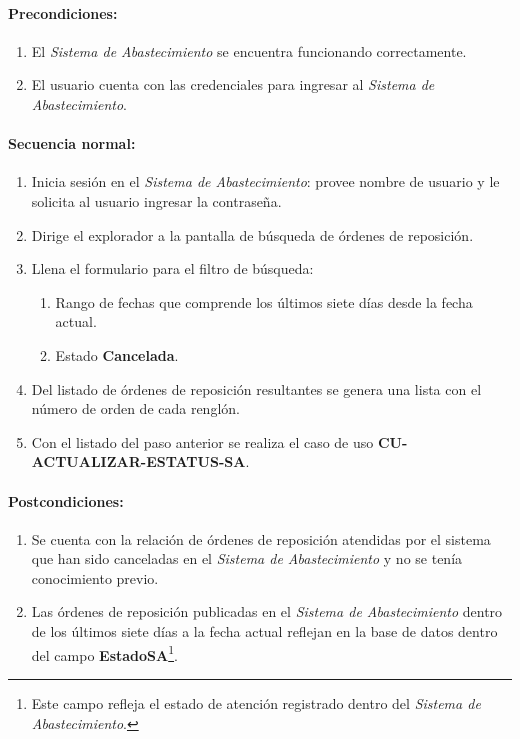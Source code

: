 \paragraph{Precondiciones:}
\begin{enumerate}
  \item El \textit{Sistema de Abastecimiento} se encuentra funcionando correctamente.
  \item El usuario cuenta con las credenciales para ingresar al \textit{Sistema de Abastecimiento}.
\end{enumerate}
\pagebreak
\paragraph{Secuencia normal:}
\begin{enumerate}
  \item Inicia sesión en el \textit{Sistema de Abastecimiento}: provee nombre de usuario y le solicita al usuario ingresar la contraseña.
  \item Dirige el explorador a la pantalla de búsqueda de órdenes de reposición.
  \item Llena el formulario para el filtro de búsqueda:
  \begin{enumerate}
    \item Rango de fechas que comprende los últimos siete días desde la fecha actual.
    \item Estado \textbf{Cancelada}.
  \end{enumerate}
  \item Del listado de órdenes de reposición resultantes se genera una lista con el número de orden de cada renglón.
  \item Con el listado del paso anterior se realiza el caso de uso \textbf{CU-ACTUALIZAR-ESTATUS-SA}.
\end{enumerate}
\paragraph{Postcondiciones:}
\begin{enumerate}
  \item Se cuenta con la relación de órdenes de reposición atendidas por el sistema que han sido canceladas en el \textit{Sistema de Abastecimiento} y no se tenía conocimiento previo.
  \item Las órdenes de reposición publicadas en el \textit{Sistema de Abastecimiento} dentro de los últimos siete días a la fecha actual reflejan en la base de datos dentro del campo \textbf{EstadoSA}\footnote{Este campo refleja el estado de atención registrado dentro del \textit{Sistema de Abastecimiento}.}.
\end{enumerate}
